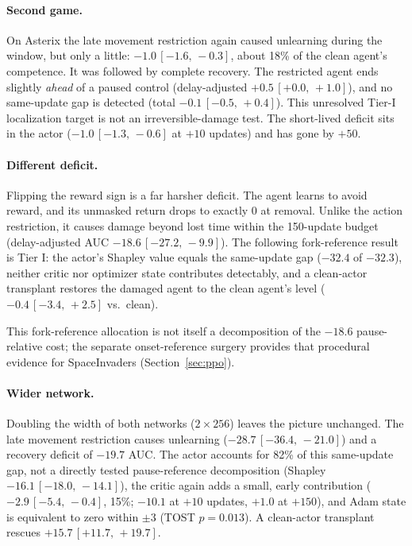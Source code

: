 \documentclass[10pt]{article} %
\newcommand{\ci}[2]{\,[#1,\,#2]}
\begin{document}
\paragraph{Second game.} On Asterix the late movement restriction again caused unlearning during the window, but only a little: $-1.0\ci{-1.6}{-0.3}$, about 18\% of the clean agent's competence. It was followed by complete recovery. The restricted agent ends slightly \emph{ahead} of a paused control (delay-adjusted $+0.5\ci{+0.0}{+1.0}$), and no same-update gap is detected (total $-0.1\ci{-0.5}{+0.4}$). This unresolved Tier-I localization target is not an irreversible-damage test. The short-lived deficit sits in the actor ($-1.0\ci{-1.3}{-0.6}$ at $+10$ updates) and has gone by $+50$.

\paragraph{Different deficit.} Flipping the reward sign is a far harsher deficit. The agent learns to avoid reward, and its unmasked return drops to exactly 0 at removal. Unlike the action restriction, it causes damage beyond lost time within the 150-update budget (delay-adjusted AUC $-18.6\ci{-27.2}{-9.9}$). The following fork-reference result is Tier I: the actor's Shapley value equals the same-update gap ($-32.4$ of $-32.3$), neither critic nor optimizer state contributes detectably, and a clean-actor transplant restores the damaged agent to the clean agent's level ($-0.4\ci{-3.4}{+2.5}$ vs.\ clean).

This fork-reference allocation is not itself a decomposition of the $-18.6$ pause-relative cost; the separate onset-reference surgery provides that procedural evidence for SpaceInvaders (Section~\ref{sec:ppo}).

\paragraph{Wider network.} Doubling the width of both networks ($2\times256$) leaves the picture unchanged. The late movement restriction causes unlearning ($-28.7\ci{-36.4}{-21.0}$) and a recovery deficit of $-19.7$ AUC. The actor accounts for 82\% of this same-update gap, not a directly tested pause-reference decomposition (Shapley $-16.1\ci{-18.0}{-14.1}$), the critic again adds a small, early contribution ($-2.9\ci{-5.4}{-0.4}$, 15\%; $-10.1$ at $+10$ updates, $+1.0$ at $+150$), and Adam state is equivalent to zero within $\pm3$ (TOST $p=0.013$). A clean-actor transplant rescues $+15.7\ci{+11.7}{+19.7}$.
\end{document}
